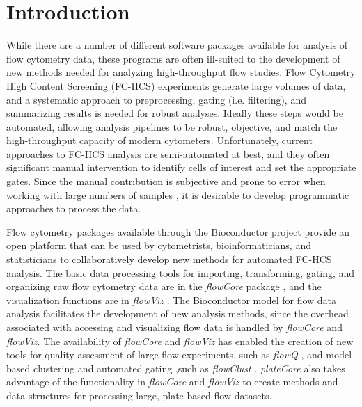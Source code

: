 \documentclass[12pt]{article}
\newcommand{\Rpackage}[1]{{\textit{#1}}}
\begin{document}
\clearpage
\section*{Introduction}

While there are a number of different software packages available for analysis of flow cytometry data, these programs are often
ill-suited to the development of new methods needed for analyzing high-throughput flow studies.
Flow Cytometry High Content Screening (FC-HCS) experiments generate large volumes of data, and a systematic approach to
preprocessing, gating (i.e. filtering), and summarizing results is needed for robust analyses. 
Ideally these steps would be automated,
allowing analysis pipelines to be robust, objective, and match the high-throughput capacity of modern cytometers. 
Unfortunately, current approaches to FC-HCS analysis are semi-automated at best,
and they often significant manual intervention to identify cells of interest and set the appropriate gates. 
Since the manual contribution is subjective and prone to error when working with large numbers of samples \citep{Maecker2005},
it is desirable to develop programmatic approaches to process the data.

Flow cytometry packages available through the Bioconductor \citep{BIOC} project provide an open platform that
can be used by cytometrists, bioinformaticians, and statisticians to collaboratively develop new methods for
automated FC-HCS analysis.  The basic data processing tools for importing, transforming, gating, and
organizing raw flow cytometry data are in the \Rpackage{flowCore} package \citep{hahne2009}, and the visualization functions are
in \Rpackage{flowViz} \citep{sarkar2008ufv}. The Bioconductor model for flow data analysis facilitates
the development of new analysis methods, since the overhead associated with
accessing and visualizing flow data is handled by \Rpackage{flowCore} and \Rpackage{flowViz}.
The availability of \Rpackage{flowCore} and \Rpackage{flowViz} has enabled the creation of new tools for
quality assessment of large flow experiments, such as \Rpackage{flowQ} \citep{}, and model-based clustering and automated gating
,such as \Rpackage{flowClust} \cite{lo2008agf}.
\Rpackage{plateCore} also takes advantage of the functionality in \Rpackage{flowCore} and \Rpackage{flowViz}
to create methods and data structures for processing large, plate-based flow datasets.  
\end{document}
